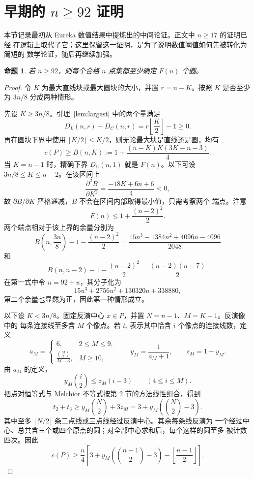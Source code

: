 \documentclass[11pt,a4paper]{ctexart}
\newtheorem{proposition}[theorem]{命题}
\theoremstyle{definition}
\begin{document}
\section{早期的 \texorpdfstring{$n\ge92$}{n>=92} 证明}
\label{app:early92}

本节记录最初从 Eureka 数值结果中提炼出的中间论证。正文中 $n\ge17$ 的证明已经
在逻辑上取代了它；这里保留这一证明，是为了说明数值阈值如何先被转化为简短的
数学论证，随后再继续加强。

\begin{proposition}
若 $n\ge92$，则每个合格 $n$ 点集都至少确定 $F(n)$ 个圆。
\end{proposition}

\begin{proof}
令 $K$ 为最大直线块或最大圆块的大小，并置 $r=n-K$。按照 $K$ 是否至少为
$3n/8$ 分成两种情形。

先设 $K\ge3n/8$。引理~\ref{lem:largest} 中的两个量满足
\[
 D_L(n,r)-D_C(n,r)=r\left\lfloor\frac K2\right\rfloor-1\ge0.
\]
再在圆块下界中使用 $\lfloor K/2\rfloor\le K/2$，则无论最大块是直线还是圆，均有
\begin{equation}\label{eq:early-B}
 c(P)\ge B(n,K):=1+\frac{(n-K)K(3K-n-3)}4.
\end{equation}
当 $K=n-1$ 时，精确下界 $D_C(n,1)$ 就是 $F(n)$。以下可设
$3n/8\le K\le n-2$。在该区间上
\[
 \frac{\partial^2 B}{\partial K^2}
 =\frac{-18K+6n+6}{4}<0,
\]
故 $\partial B/\partial K$ 严格递减，$B$ 不会在区间内部取得最小值，只需考察两个
端点。注意
\begin{equation}\label{eq:early-F-upper}
 F(n)\le1+\frac{(n-2)^2}{2}.
\end{equation}
两个端点相对于该上界的余量分别为
\[
 B\left(n,\frac{3n}{8}\right)-1-\frac{(n-2)^2}{2}
 =\frac{15n^3-1384n^2+4096n-4096}{2048}
\]
和
\[
 B(n,n-2)-1-\frac{(n-2)^2}{2}
 =\frac{(n-2)(n-7)}2.
\]
在第一式中令 $n=92+u$，其分子化为
\[
15u^3+2756u^2+130320u+338880,
\]
第二个余量也显然为正，因此第一种情形成立。

以下设 $K<3n/8$。固定反演中心 $x\in P$，并置 $N=n-1$、$M=K-1$。反演像中的
每条连接线至多含 $M$ 个像点。若 $t_i$ 表示其中恰含 $i$ 个像点的连接线数，定义
\[
 a_M=
 \begin{cases}
 6,&2\le M\le9,\\[2pt]
 \displaystyle\frac{\binom M2}{M-3},&M\ge10,
 \end{cases}
 \qquad
 y_M=\frac1{a_M+1},\qquad z_M=1-y_M.
\]
由 $a_M$ 的定义，
\[
 y_M\binom i2\le z_M(i-3)\qquad(4\le i\le M).
\]
把点对恒等式与 Melchior 不等式按第 2 节的方法线性组合，得到
\begin{equation}\label{eq:early-dual}
 t_2+t_3\ge y_M\binom N2+3z_M
 =3+y_M\left(\binom N2-3\right).
\end{equation}
其中至多 $\lfloor N/2\rfloor$ 条二点线或三点线经过反演中心。其余每条线反演为
一个经过中心、总共含三个或四个原点的圆；对全部中心求和后，每个这样的圆至多
被计数四次。因此
\begin{equation}\label{eq:early-inversion}
 c(P)\ge\frac n4\left[
 3+y_M\left(\binom{n-1}{2}-3\right)
 -\left\lfloor\frac{n-1}{2}\right\rfloor\right].
\end{equation}


\end{proof}
\end{document}
